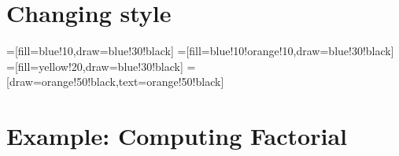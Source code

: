 \documentclass{article}
\begin{document}
\section{Changing style}

{%
=[fill=blue!10,draw=blue!30!black]
=[fill=blue!10!orange!10,draw=blue!30!black]
=[fill=yellow!20,draw=blue!30!black]
=[draw=orange!50!black,text=orange!50!black]

\begin{drawstack}
   
\end{drawstack}
}

\section{Example: Computing Factorial}

\begin{drawstack}[scale=0.8]
  \startframe
  \startframe
  \cell{$\vdots$}
  \startframe
\end{drawstack}
\end{document}
